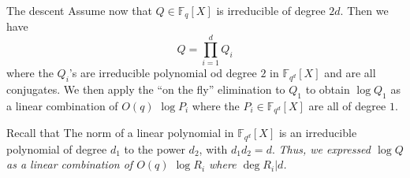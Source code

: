 \documentclass[xcolor=x11names,compress]{beamer}
\theoremstyle{break}
\theoremstyle{sc}
\theoremstyle{definition}
\theoremstyle{remark}
\begin{document}
\begin{frame}{The descent}
  Assume now that $Q\in\mathbb{F}_{q}[X]$ is irreducible of degree $2d$. Then we
  have
  \[
    Q=\prod_{i=1}^d Q_i
  \]
  where the $Q_i$'s are irreducible polynomial od degree $2$ in
  $\mathbb{F}_{q^d}[X]$ and are all conjugates. We then apply the ``on the fly''
  elimination to $Q_1$ to obtain $\log Q_1$ as a linear combination of 
  $O(q)$ $\log P_i$ where the $P_i\in \mathbb{F}_{q^d}[X]$ are all of degree $1$.
  
  Recall that The norm of a linear polynomial in $\mathbb{F}_{q^d}[X]$ is an irreducible
  polynomial of degree $d_1$ to the power $d_2$, with $d_1d_2 = d$.
  \emph{Thus, we expressed $\log Q$ as a linear combination of $O(q)$ $\log
  R_i$ where $\deg R_i | d$.}
\end{frame}

\end{document}
